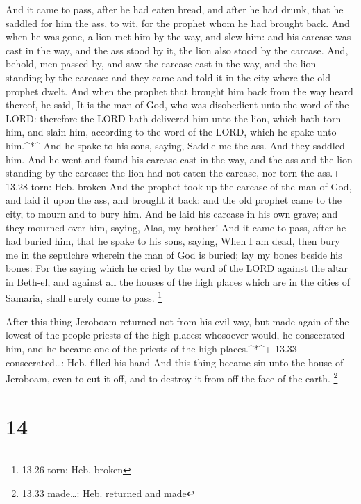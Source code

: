  And it came to pass, after he had eaten bread, and after
he had drunk, that he saddled for him the ass, to wit, for the prophet
whom he had brought back.  And when he was gone, a lion met
him by the way, and slew him: and his carcase was cast in the way, and
the ass stood by it, the lion also stood by the carcase. 
And, behold, men passed by, and saw the carcase cast in the way, and the
lion standing by the carcase: and they came and told it in the city
where the old prophet dwelt.  And when the prophet that
brought him back from the way heard thereof, he said, It is the man of
God, who was disobedient unto the word of the LORD: therefore the LORD
hath delivered him unto the lion, which hath torn him, and slain him,
according to the word of the LORD, which he spake unto him.\^{}*\^{}
 And he spake to his sons, saying, Saddle me the ass. And
they saddled him.  And he went and found his carcase cast
in the way, and the ass and the lion standing by the carcase: the lion
had not eaten the carcase, nor torn the ass.+ 13.28 torn: Heb. broken
 And the prophet took up the carcase of the man of God, and
laid it upon the ass, and brought it back: and the old prophet came to
the city, to mourn and to bury him.  And he laid his
carcase in his own grave; and they mourned over him, saying, Alas, my
brother!  And it came to pass, after he had buried him,
that he spake to his sons, saying, When I am dead, then bury me in the
sepulchre wherein the man of God is buried; lay my bones beside his
bones:  For the saying which he cried by the word of the
LORD against the altar in Beth-el, and against all the houses of the
high places which are in the cities of Samaria, shall surely come to
pass. \footnote{13.26 torn: Heb. broken}

 After this thing Jeroboam returned not from his evil way,
but made again of the lowest of the people priests of the high places:
whosoever would, he consecrated him, and he became one of the priests of
the high places.\^{}*\^{}+ 13.33 consecrated\ldots: Heb. filled his hand
 And this thing became sin unto the house of Jeroboam, even
to cut it off, and to destroy it from off the face of the earth.
\footnote{13.33 made\ldots: Heb. returned and made}

\hypertarget{section-13}{%
\section{14}\label{section-13}}

